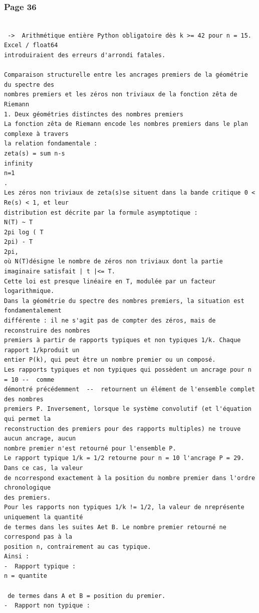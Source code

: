 \documentclass[11pt,a4paper]{article}
\begin{document}
\subsubsection*{Page 36}
\begin{Verbatim}[fontsize=\footnotesize]
 
 ->  Arithmétique entière Python obligatoire dès k >= 42 pour n = 15. Excel / float64 
introduiraient des erreurs d'arrondi fatales. 
 
Comparaison structurelle entre les ancrages premiers de la géométrie du spectre des 
nombres premiers et les zéros non triviaux de la fonction zêta de Riemann 
1. Deux géométries distinctes des nombres premiers 
La fonction zêta de Riemann encode les nombres premiers dans le plan complexe à travers 
la relation fondamentale : 
zeta(s) = sum n-s
infinity
n=1
. 
Les zéros non triviaux de zeta(s)se situent dans la bande critique 0 < Re(s) < 1, et leur 
distribution est décrite par la formule asymptotique : 
N(T) ~ T
2pi log ( T
2pi) - T
2pi, 
où N(T)désigne le nombre de zéros non triviaux dont la partie imaginaire satisfait | t |<= T. 
Cette loi est presque linéaire en T, modulée par un facteur logarithmique. 
Dans la géométrie du spectre des nombres premiers, la situation est fondamentalement 
différente : il ne s'agit pas de compter des zéros, mais de reconstruire des nombres 
premiers à partir de rapports typiques et non typiques 1/k. Chaque rapport 1/kproduit un 
entier P(k), qui peut être un nombre premier ou un composé. 
Les rapports typiques et non typiques qui possèdent un ancrage pour n = 10 --  comme 
démontré précédemment  --  retournent un élément de l'ensemble complet des nombres 
premiers P. Inversement, lorsque le système convolutif (et l'équation qui permet la 
reconstruction des premiers pour des rapports multiples) ne trouve aucun ancrage, aucun 
nombre premier n'est retourné pour l'ensemble P. 
Le rapport typique 1/k = 1/2 retourne pour n = 10 l'ancrage P = 29. Dans ce cas, la valeur
de ncorrespond exactement à la position du nombre premier dans l'ordre chronologique 
des premiers. 
Pour les rapports non typiques 1/k != 1/2, la valeur de nreprésente uniquement la quantité 
de termes dans les suites Aet B. Le nombre premier retourné ne correspond pas à la 
position n, contrairement au cas typique. 
Ainsi : 
-  Rapport typique : 
n = quantite

 de termes dans A et B = position du premier. 
-  Rapport non typique : 
\end{Verbatim}
\medskip
\end{document}
